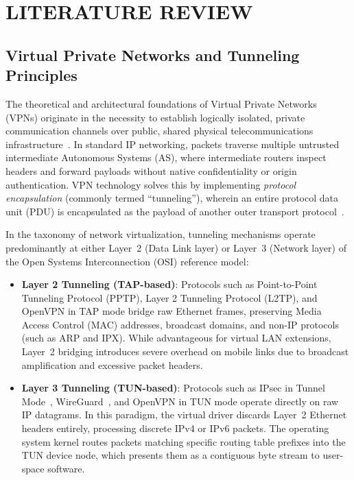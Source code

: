 
\chapter{LITERATURE REVIEW}
\label{chap:literature_review}

\section{Virtual Private Networks and Tunneling Principles}
\label{sec:vpn_tunneling_principles}

The theoretical and architectural foundations of Virtual Private Networks (VPNs) originate in the necessity to establish logically isolated, private communication channels over public, shared physical telecommunications infrastructure~\cite{stallings2022cryptography}. In standard IP networking, packets traverse multiple untrusted intermediate Autonomous Systems (AS), where intermediate routers inspect headers and forward payloads without native confidentiality or origin authentication. VPN technology solves this by implementing \textit{protocol encapsulation} (commonly termed ``tunneling''), wherein an entire protocol data unit (PDU) is encapsulated as the payload of another outer transport protocol~\cite{menezes1996handbook}.

In the taxonomy of network virtualization, tunneling mechanisms operate predominantly at either Layer~2 (Data Link layer) or Layer~3 (Network layer) of the Open Systems Interconnection (OSI) reference model:
\begin{itemize}
    \item \textbf{Layer 2 Tunneling (TAP-based)}: Protocols such as Point-to-Point Tunneling Protocol (PPTP), Layer 2 Tunneling Protocol (L2TP), and OpenVPN in TAP mode bridge raw Ethernet frames, preserving Media Access Control (MAC) addresses, broadcast domains, and non-IP protocols (such as ARP and IPX). While advantageous for virtual LAN extensions, Layer~2 bridging introduces severe overhead on mobile links due to broadcast amplification and excessive packet headers.
    \item \textbf{Layer 3 Tunneling (TUN-based)}: Protocols such as IPsec in Tunnel Mode~\cite{rfc4301}, WireGuard~\cite{donenfeld2017wireguard}, and OpenVPN in TUN mode operate directly on raw IP datagrams. In this paradigm, the virtual driver discards Layer~2 Ethernet headers entirely, processing discrete IPv4 or IPv6 packets. The operating system kernel routes packets matching specific routing table prefixes into the TUN device node, which presents them as a contiguous byte stream to user-space software.
\end{itemize}

